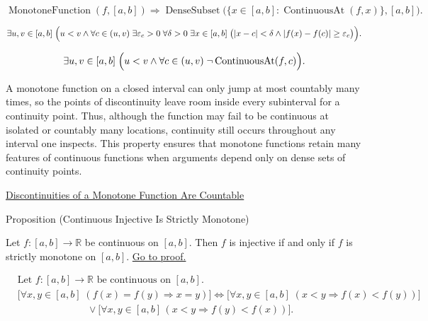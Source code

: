 \begin{remark*}
\[
\operatorname{MonotoneFunction}(f,[a,b])
\Longrightarrow
\operatorname{DenseSubset}\bigl(\{x\in[a,b]:\operatorname{ContinuousAt}(f,x)\},[a,b]\bigr).
\]
\end{remark*}

\begin{remark*}
\[
\exists u,v\in[a,b]\;
\Bigl(u<v \land
\forall c\in(u,v)\;\exists \varepsilon_c>0\;\forall \delta>0\;\exists x\in[a,b]\;
\bigl(|x-c|<\delta\land |f(x)-f(c)|\ge\varepsilon_c\bigr)\Bigr).
\]
\end{remark*}

\begin{remark*}
\[
\exists u,v\in[a,b]\;
\Bigl(u<v \land
\forall c\in(u,v)\;\neg\operatorname{ContinuousAt}(f,c)\Bigr).
\]
\end{remark*}

\begin{remark*}[Interpretation]
A monotone function on a closed interval can only jump at most countably many times, so the points of discontinuity leave room inside every subinterval for a continuity point. Thus, although the function may fail to be continuous at isolated or countably many locations, continuity still occurs throughout any interval one inspects. This property ensures that monotone functions retain many features of continuous functions when arguments depend only on dense sets of continuity points.
\end{remark*}

\begin{dependencies}
\hyperref[thm:monotone-discontinuities-countable]{Discontinuities of a Monotone Function Are Countable}
\end{dependencies}

\begin{propositionbox}{Proposition (Continuous Injective Is Strictly Monotone)}
\begin{proposition}
\label{prop:continuous-injective-iff-strictly-monotone}
Let $f:[a,b]\to\mathbb{R}$ be continuous on $[a,b]$. Then $f$ is injective if and only if $f$ is strictly monotone on $[a,b]$.
\hyperref[prf:continuous-injective-iff-strictly-monotone]{Go to proof.}
\end{proposition}
\end{propositionbox}

\begin{remark*}
\[
\begin{aligned}
&\text{Let } f:[a,b]\to\mathbb{R} \text{ be continuous on } [a,b].\\
&\bigl[\forall x,y\in[a,b]\;(f(x)=f(y)\Rightarrow x=y)\bigr] \Longleftrightarrow
\bigl[\forall x,y\in[a,b]\;(x<y\Rightarrow f(x)<f(y))\bigr]\\
&\qquad\qquad\qquad\quad\lor
\bigl[\forall x,y\in[a,b]\,(x<y\Rightarrow f(y)<f(x))\bigr].
\end{aligned}
\]
\end{remark*}

